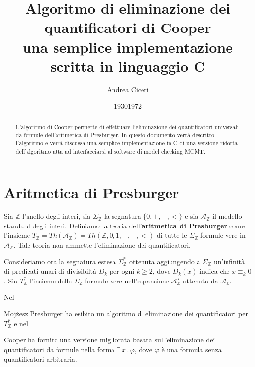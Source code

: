 \documentclass[11pt,letterpaper,twoside]{article}
\begin{document}
\newcommand{\src}[2]{\inputminted[linenos, mathescape=true, firstline={#1},
  lastline={#2}]{C}{../cooper.c}}
\newcommand{\inline}[1]{\texttt{#1}}

\title{%
  Algoritmo di eliminazione dei quantificatori di Cooper\\
  \large una semplice implementazione scritta in linguaggio C}
\author{Andrea Ciceri}
\maketitle

\begin{abstract}
  L'algoritmo di Cooper permette di effettuare l'eliminazione dei quantificatori
  universali da formule dell'aritmetica di Presburger. In questo documento
  verr\`a descritto l'algoritmo e verr\`a discussa una semplice implementazione
  in C di una versione ridotta dell'algoritmo atta ad interfacciarsi al
  software di model checking MCMT\autocite{mcmt}.  
\end{abstract}

\section{Aritmetica di Presburger}
Sia $\mathbb{Z}$ l'anello degli interi, sia $\Sigma_{\mathbb{Z}}$ la segnatura
$\{0, +, -, <\}$ e sia $\mathcal{A}_{\mathbb{Z}}$ il modello standard degli
interi.
Definiamo la teoria dell'\textbf{aritmetica di Presburger} come l'insieme
$T_{\mathbb{Z}}=Th(\mathcal{A}_{\mathbb{Z}})=Th(\mathbb{Z}, 0, 1, +, -, <)$ di
tutte le $\Sigma_{\mathbb{Z}}$-formule vere in $\mathcal{A}_{\mathbb{Z}}$.
Tale teoria non ammette l'eliminazione dei quantificatori.

Consideriamo ora la segnatura estesa $\Sigma_{\mathbb{Z}}^*$ ottenuta aggiungendo
a $\Sigma_{\mathbb{Z}}$ un'infinit\`a di predicati unari di divisibilt\`a $D_k$
per ogni $k \ge 2$, dove $D_k(x)$ indica che $x \equiv_k 0$.
Sia $T_{\mathbb{Z}}^*$ l'insieme delle $\Sigma_{\mathbb{Z}}$-formule vere
nell'espansione $\mathcal{A}_{\mathbb{Z}}^\star$ ottenuta da
$\mathcal{A}_{\mathbb{Z}}$.

Nel \date{1930} Moj\.zesz Presburger ha esibito un algoritmo di eliminazione dei
quantificatori\autocite{presburger} per $T_{\mathbb{Z}}^*$ e nel \date{1972} Cooper ha fornito una
versione migliorata basata sull'eliminazione dei quantificatori da formule nella
forma $\exists \,x \,.\, \varphi$, dove $\varphi$ \`e una formula senza
quantificatori arbitraria.
\end{document}

